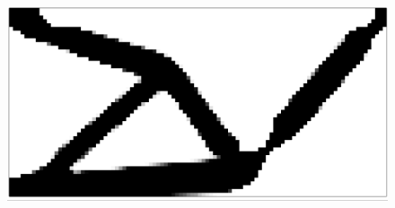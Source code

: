   \hspace{0.2cm}
 \begin{subfigure}[t]{0.25\columnwidth} %
     \centering
		   \includegraphics[width=\textwidth]{images/chap5/Inverter_evo_final.png} %
 \end{subfigure}
